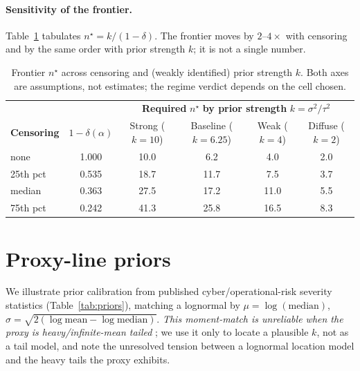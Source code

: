 \documentclass[11pt]{article}
\begin{document}
\paragraph{Sensitivity of the frontier.} Table~\ref{tab:val} tabulates $n^\star=k/(1-\delta)$.
The frontier moves by $2$--$4\times$ with censoring and by the same order with prior strength
$k$; it is not a single number.
\begin{table}[h]\centering
\begin{tabular}{l|c|cccc}
\toprule
& & \multicolumn{4}{c}{\textbf{Required } $n^\star$ \textbf{ by prior strength } $k=\sigma^2/\tau^2$}\\
\textbf{Censoring} & $1-\delta(\alpha)$ & Strong ($k{=}10$) & Baseline ($k{=}6.25$) & Weak ($k{=}4$) & Diffuse ($k{=}2$)\\
\midrule
none & 1.000 & 10.0 & 6.2  & 4.0 & 2.0\\
25th pct & 0.535 & 18.7 & 11.7 & 7.5 & 3.7\\
median & 0.363 & 27.5 & 17.2 & 11.0& 5.5\\
75th pct & 0.242 & 41.3 & 25.8 & 16.5& 8.3\\
\bottomrule
\end{tabular}
\caption{Frontier $n^\star$ across censoring and (weakly identified) prior strength $k$. Both
axes are assumptions, not estimates; the regime verdict depends on the cell chosen.}
\label{tab:val}
\end{table}

\section{Proxy-line priors}\label{sec:priors}
We illustrate prior calibration from published cyber/operational-risk severity statistics
(Table~\ref{tab:priors}), matching a lognormal by $\mu=\log(\text{median})$,
$\sigma=\sqrt{2(\log\text{mean}-\log\text{median})}$. \emph{This moment-match is unreliable when
the proxy is heavy/infinite-mean tailed} \citep{elingjung2022,cremer2023}; we use it only to
locate a plausible $k$, not as a tail model, and note the unresolved tension between a lognormal
location model and the heavy tails the proxy exhibits.
\end{document}

